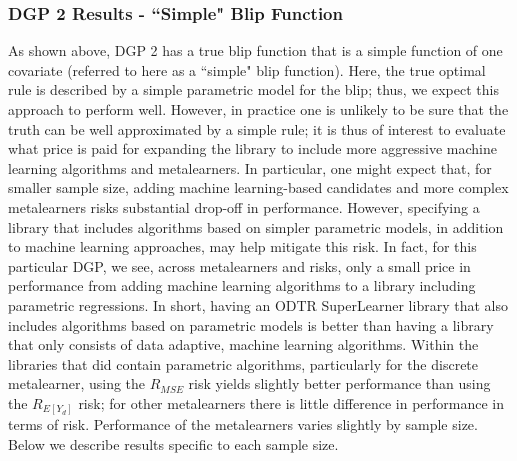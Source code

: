 \documentclass[a4paper,12pt]{article}
\begin{document}


\subsubsection{DGP 2 Results - ``Simple" Blip Function}

As shown above, DGP 2 has a true blip function that is a simple function of one covariate (referred to here as a ``simple" blip function). Here, the true optimal rule is described by a simple parametric model for the blip; thus, we expect this approach to perform well. However, in practice one is unlikely to be sure that the truth can be well approximated by a simple rule; it is thus of interest to evaluate what price is paid for expanding the library to include more aggressive machine learning algorithms and metalearners. In particular, one might expect that, for smaller sample size, adding machine learning-based candidates and more complex metalearners risks substantial drop-off in performance. However, specifying a library that includes algorithms based on simpler parametric models, in addition to machine learning approaches, may help mitigate this risk. In fact, for this particular DGP, we see, across metalearners and risks, only a small price in performance from adding machine learning algorithms to a library including parametric regressions. In short, having an ODTR SuperLearner library that also includes algorithms based on parametric models is better than having a library that only consists of data adaptive, machine learning algorithms. Within the libraries that did contain parametric algorithms, particularly for the discrete metalearner, using the $R_{MSE}$ risk yields slightly better performance than using the $R_{E[Y_d]}$ risk; for other metalearners there is little difference in performance in terms of risk. Performance of the metalearners varies slightly by sample size. Below we describe results specific to each sample size.
\end{document}

